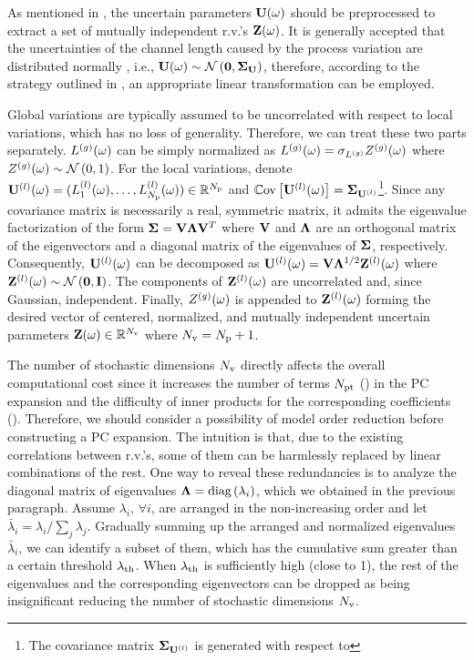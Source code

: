 As mentioned in , the uncertain parameters $\mathbf{U}(\omega)$ should be preprocessed to extract a set of mutually independent r.v.'s $\mathbf{Z}(\omega)$. It is generally accepted that the uncertainties of the channel length caused by the process variation are distributed normally \cite{juan2011, juan2012, srivastava2010}, i.e., $\vU(\o) \sim \normal{\vZero}{\mCov_\vU}$, therefore, according to the strategy outlined in , an appropriate linear transformation can be employed.

Global variations are typically assumed to be uncorrelated with respect to local variations, which has no loss of generality. Therefore, we can treat these two parts separately. ${L^{(g)}}(\omega)$ can be simply normalized as ${L^{(g)}}(\omega) = \sigma_{L^{(g)}} {Z^{(g)}}(\omega)$ where ${Z^{(g)}}(\omega) \sim \mathcal{N}\left( 0, 1 \right)$. For the local variations, denote ${\mathbf{U}^{(l)}}(\omega) = (L^{(l)}_1(\omega), \dotsc, L^{(l)}_{N_\text{p}}(\omega)) \in \mathbb{R}^{N_\text{p}}$ and $\oCov{\vlLeff(\o)} = \mCov_\vlLeff$\footnote{The covariance matrix $\mCov_\vlLeff$ is generated with respect to }. Since any covariance matrix is necessarily a real, symmetric matrix, it admits the eigenvalue factorization \cite{press2007} of the form $\mCov = \m{V} \m{\Lambda} \m{V}^T$ where $\m{V}$ and $\m{\Lambda}$ are an orthogonal matrix of the eigenvectors and a diagonal matrix of the eigenvalues of $\mCov$, respectively. Consequently, ${\mathbf{U}^{(l)}}(\omega)$ can be decomposed as $\vlLeff(\o) = \m{V} \m{\Lambda}^\ifrac{1}{2} \vlZ(\o)$ where $\vlZ(\o) \sim \normal{\vZero}{\mI}$. The components of ${\mathbf{Z}^{(l)}}(\omega)$ are uncorrelated and, since Gaussian, independent. Finally, ${Z^{(g)}}(\omega)$ is appended to ${\mathbf{Z}^{(l)}}(\omega)$ forming the desired vector of centered, normalized, and mutually independent uncertain parameters $\mathbf{Z}(\omega) \in \mathbb{R}^{N_\text{v}}$ where ${N_\text{v}} = {N_\text{p}} + 1$.

The number of stochastic dimensions ${N_\text{v}}$ directly affects the overall computational cost since it increases the number of terms ${N_\text{pt}}$ () in the PC expansion and the difficulty of inner products for the corresponding coefficients (). Therefore, we should consider a possibility of model order reduction before constructing a PC expansion. The intuition is that, due to the existing correlations between r.v.'s, some of them can be harmlessly replaced by linear combinations of the rest. One way to reveal these redundancies is to analyze the diagonal matrix of eigenvalues $\m{\Lambda} = \diag{ \lambda_i }$, which we obtained in the previous paragraph. Assume $\lambda_i$, $\forall i$, are arranged in the non-increasing order and let $\bar{\lambda}_i = \lambda_i / \sum_j \lambda_j$. Gradually summing up the arranged and normalized eigenvalues $\bar{\lambda}_i$, we can identify a subset of them, which has the cumulative sum greater than a certain threshold $\lambda_\text{th}$. When $\lambda_\text{th}$ is sufficiently high (close to 1), the rest of the eigenvalues and the corresponding eigenvectors can be dropped as being insignificant reducing the number of stochastic dimensions ${N_\text{v}}$.

